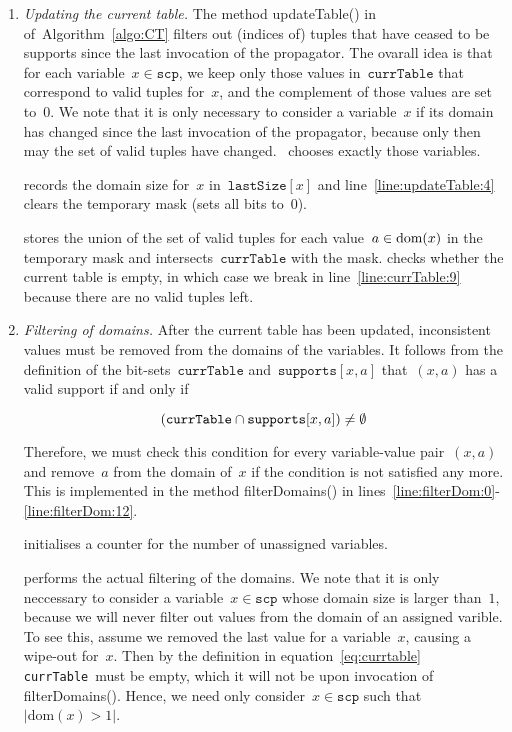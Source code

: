 \documentclass[a4paper,11pt]{article}
\newcommand{\Algoref}[1]{Algorithm~\ref{#1}}
\newcommand{\Dom}[1]{\text{dom}({#1})}
\newcommand{\Scp}{\texttt{scp}}
\newcommand{\CurrTable}{\texttt{currTable}}
\newcommand{\LastSizes}{\texttt{lastSize}}
\newcommand{\Supports}{\texttt{supports}}
\numberwithin{equation}{section}
\begin{document}
\begin{enumerate}
\item \textit{Updating the current table.} 
  The method updateTable() in 
   of~\Algoref{algo:CT}
  filters out (indices of)
  tuples that have ceased to be supports since the last invocation of the
  propagator. The ovarall idea is that for each variable~$x \in \Scp$, we keep 
  only those values in~$\CurrTable$ that correspond to valid tuples for~$x$, and the
  complement of those values are set to~$0$. We note that
  it is only necessary to consider a variable~$x$ if its domain has changed
  since the last invocation of the propagator, because only then
  may the set of valid tuples have changed.~
  chooses exactly those variables.

   records the domain size for~$x$ in~$\LastSizes[x]$
  and line~\ref{line:updateTable:4} clears the temporary mask (sets all bits to~$0$).

   stores the union of the
  set of valid tuples for each value~$a \in \text{dom}(x)$ in the temporary mask
  and  intersects~$\CurrTable$ with the mask.
   checks whether the current table is empty,
  in which case we break in line~\ref{line:currTable:9}
  because there are no valid tuples left.

\item 
  \textit{Filtering of domains.}
  After the current table has been updated, inconsistent values must be removed
  from the domains of the variables.   
  It follows from the definition of the bit-sets~$\CurrTable$ and~$\Supports[x,a]$
  that~$(x,a)$ has a valid support if and only if 

  \begin{equation}
    \label{eq:validcond}
    (\CurrTable \Inter \Supports[x,a]) \neq \emptyset
  \end{equation}

  Therefore, we must check this condition for every variable-value pair~$(x,a)$ and
  remove~$a$ from the domain of~$x$ if the condition is not satisfied any more.
  This is implemented in the method filterDomains()
  in lines~\ref{line:filterDom:0}-\ref{line:filterDom:12}.

   initialises a counter for the number of unassigned
  variables.

   performs the
  actual filtering of the domains. We note that it is only neccessary to
  consider a variable~$x \in \Scp$ whose domain size is larger than~$1$,
  because we will never filter out values from the domain of an assigned
  varible. To see this, assume we removed the last value for a variable~$x$,
  causing a wipe-out for~$x$. Then by the definition in equation~\eqref{eq:currtable}
  \CurrTable~must be empty,
  which it will not be upon invocation of filterDomains(). Hence, we need
  only consider~$x \in \Scp$ such that~$|\Dom{x} > 1|$.


\end{enumerate}
\end{document}
